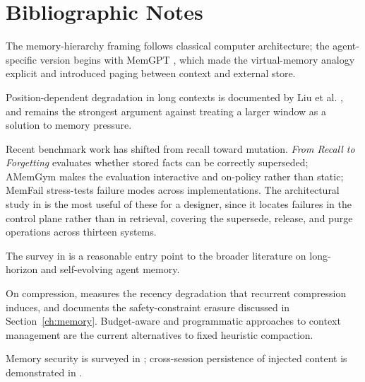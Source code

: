 \section*{Bibliographic Notes}

The memory-hierarchy framing follows classical computer architecture; the
agent-specific version begins with MemGPT \cite{packer2023memgpt}, which made the
virtual-memory analogy explicit and introduced paging between context and
external store.

Position-dependent degradation in long contexts is documented by Liu et al.
\cite{liu2024lost}, and remains the strongest argument against treating a larger
window as a solution to memory pressure.

Recent benchmark work has shifted from recall toward mutation. \emph{From Recall
to Forgetting} \cite{recallforget2026} evaluates whether stored facts can be
correctly superseded; AMemGym \cite{amemgym2026} makes the evaluation interactive
and on-policy rather than static; MemFail \cite{memfail2026} stress-tests failure
modes across implementations. The architectural study in \cite{controlplane2026}
is the most useful of these for a designer, since it locates failures in the control plane rather than in retrieval, covering the supersede, release, and purge operations across thirteen systems.

The survey in \cite{memsurvey2026} is a reasonable entry point to the broader
literature on long-horizon and self-evolving agent memory.

On compression, \cite{compressreliab2026} measures the recency degradation that
recurrent compression induces, and \cite{govdecay2026} documents the
safety-constraint erasure discussed in Section~\ref{ch:memory}. Budget-aware
\cite{contextbudget2026} and programmatic \cite{contextenv2026, acmgmt2026}
approaches to context management are the current alternatives to fixed heuristic
compaction.

Memory security is surveyed in \cite{memsec2026}; cross-session persistence of
injected content is demonstrated in \cite{crosssession2026}.

